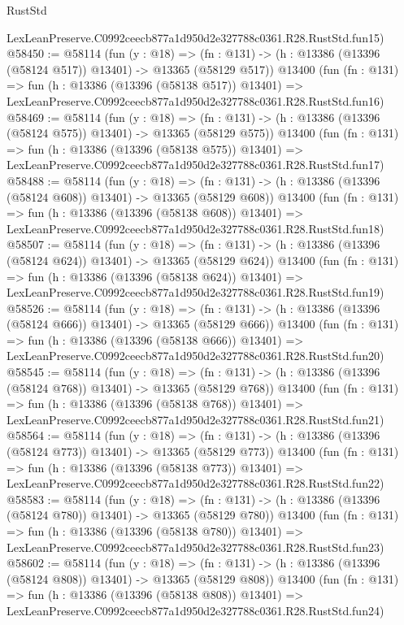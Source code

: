 \begin{lexlean}{RustStd}
\begin{coremodule}
    LexLeanPreserve.C0992ceecb877a1d950d2e327788c0361.R28.RustStd.fun15)
@58450 := @58114
    (fun (y : @18) =>
    (fn : @131) -> (h : @13386 (@13396 (@58124 @517)) @13401) -> @13365 (@58129 @517))
    @13400
    (fun (fn : @131) =>
    fun (h : @13386 (@13396 (@58138 @517)) @13401) =>
    LexLeanPreserve.C0992ceecb877a1d950d2e327788c0361.R28.RustStd.fun16)
@58469 := @58114
    (fun (y : @18) =>
    (fn : @131) -> (h : @13386 (@13396 (@58124 @575)) @13401) -> @13365 (@58129 @575))
    @13400
    (fun (fn : @131) =>
    fun (h : @13386 (@13396 (@58138 @575)) @13401) =>
    LexLeanPreserve.C0992ceecb877a1d950d2e327788c0361.R28.RustStd.fun17)
@58488 := @58114
    (fun (y : @18) =>
    (fn : @131) -> (h : @13386 (@13396 (@58124 @608)) @13401) -> @13365 (@58129 @608))
    @13400
    (fun (fn : @131) =>
    fun (h : @13386 (@13396 (@58138 @608)) @13401) =>
    LexLeanPreserve.C0992ceecb877a1d950d2e327788c0361.R28.RustStd.fun18)
@58507 := @58114
    (fun (y : @18) =>
    (fn : @131) -> (h : @13386 (@13396 (@58124 @624)) @13401) -> @13365 (@58129 @624))
    @13400
    (fun (fn : @131) =>
    fun (h : @13386 (@13396 (@58138 @624)) @13401) =>
    LexLeanPreserve.C0992ceecb877a1d950d2e327788c0361.R28.RustStd.fun19)
@58526 := @58114
    (fun (y : @18) =>
    (fn : @131) -> (h : @13386 (@13396 (@58124 @666)) @13401) -> @13365 (@58129 @666))
    @13400
    (fun (fn : @131) =>
    fun (h : @13386 (@13396 (@58138 @666)) @13401) =>
    LexLeanPreserve.C0992ceecb877a1d950d2e327788c0361.R28.RustStd.fun20)
@58545 := @58114
    (fun (y : @18) =>
    (fn : @131) -> (h : @13386 (@13396 (@58124 @768)) @13401) -> @13365 (@58129 @768))
    @13400
    (fun (fn : @131) =>
    fun (h : @13386 (@13396 (@58138 @768)) @13401) =>
    LexLeanPreserve.C0992ceecb877a1d950d2e327788c0361.R28.RustStd.fun21)
@58564 := @58114
    (fun (y : @18) =>
    (fn : @131) -> (h : @13386 (@13396 (@58124 @773)) @13401) -> @13365 (@58129 @773))
    @13400
    (fun (fn : @131) =>
    fun (h : @13386 (@13396 (@58138 @773)) @13401) =>
    LexLeanPreserve.C0992ceecb877a1d950d2e327788c0361.R28.RustStd.fun22)
@58583 := @58114
    (fun (y : @18) =>
    (fn : @131) -> (h : @13386 (@13396 (@58124 @780)) @13401) -> @13365 (@58129 @780))
    @13400
    (fun (fn : @131) =>
    fun (h : @13386 (@13396 (@58138 @780)) @13401) =>
    LexLeanPreserve.C0992ceecb877a1d950d2e327788c0361.R28.RustStd.fun23)
@58602 := @58114
    (fun (y : @18) =>
    (fn : @131) -> (h : @13386 (@13396 (@58124 @808)) @13401) -> @13365 (@58129 @808))
    @13400
    (fun (fn : @131) =>
    fun (h : @13386 (@13396 (@58138 @808)) @13401) =>
    LexLeanPreserve.C0992ceecb877a1d950d2e327788c0361.R28.RustStd.fun24)

\end{coremodule}
\end{lexlean}
